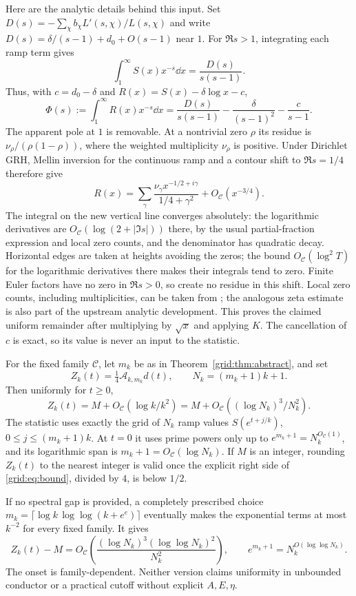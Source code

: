 Here are the analytic details behind this input. Set
$D(s)=-\sum_\chi b_\chi L'(s,\chi)/L(s,\chi)$ and write
$D(s)=\delta/(s-1)+d_0+O(s-1)$ near $1$. For $\Re s>1$, integrating
each ramp term gives
\[
 \int_1^\infty S(x)x^{-s}\dd x=\frac{D(s)}{s(s-1)}.
\]
Thus, with $c=d_0-\delta$ and $R(x)=S(x)-\delta\log x-c$,
\[
 \Phi(s):=\int_1^\infty R(x)x^{-s}\dd x
 =\frac{D(s)}{s(s-1)}-\frac{\delta}{(s-1)^2}-\frac c{s-1}.
\]
The apparent pole at $1$ is removable. At a nontrivial zero $\rho$ its
residue is $\nu_\rho/(\rho(1-\rho))$, where the weighted multiplicity
$\nu_\rho$ is positive. Under Dirichlet GRH, Mellin inversion for the
continuous ramp and a contour shift to $\Re s=1/4$ therefore give
\[
 R(x)=\sum_\gamma
 \frac{\nu_\gamma x^{-1/2+i\gamma}}{1/4+\gamma^2}
 +O_{\mathcal C}(x^{-3/4}).
\]
The integral on the new vertical line converges absolutely: the
logarithmic derivatives are $O_{\mathcal C}(\log(2+|\Im s|))$ there,
by the usual partial-fraction expression and local zero counts, and
the denominator has quadratic decay. Horizontal edges are taken at
heights avoiding the zeros; the bound $O_{\mathcal C}(\log^2 T)$ for
the logarithmic derivatives there makes their integrals tend to zero.
Finite Euler factors have no zero in $\Re s>0$, so create no residue
in this shift. Local zero counts, including multiplicities, can be
taken from \cite{Bennett2021}; the analogous zeta estimate is also
part of the upstream analytic development. This proves the claimed
uniform remainder after multiplying by $\sqrt x$ and applying $K$.
The cancellation of $c$ is exact, so its value is never an input to
the statistic.

\begin{theorem}\label{grid:thm:prime}
For the fixed family $\mathcal C$, let $m_k$ be as in
Theorem~\ref{grid:thm:abstract}, and set
\[
 Z_k(t)=\tfrac14\mathcal A_{k,m_k}d(t),\qquad
 N_k=(m_k+1)k+1.
\]
Then uniformly for $t\ge0$,
\[
 Z_k(t)=M+O_{\mathcal C}(\log k/k^2)
       =M+O_{\mathcal C}((\log N_k)^3/N_k^2).
\]
The statistic uses exactly the grid of $N_k$ ramp values
$S(e^{t+j/k})$, $0\le j\le(m_k+1)k$. At $t=0$ it uses prime powers only
up to $e^{m_k+1}=N_k^{O_{\mathcal C}(1)}$, and its logarithmic span is
$m_k+1=O_{\mathcal C}(\log N_k)$. If $M$ is an integer, rounding $Z_k(t)$
to the nearest integer is valid once the explicit right side of
\eqref{grid:eq:bound}, divided by $4$, is below $1/2$.
\end{theorem}

If no spectral gap is provided, a completely prescribed choice
$m_k=\lceil\log k\,\log\log(k+e^e)\rceil$ eventually makes the exponential
terms at most $k^{-2}$ for every fixed family. It gives
\[
 Z_k(t)-M=O_{\mathcal C}
 \left(\frac{(\log N_k)^3(\log\log N_k)^2}{N_k^2}\right),
 \qquad e^{m_k+1}=N_k^{O(\log\log N_k)}.
\]
The onset is family-dependent. Neither version claims uniformity in
unbounded conductor or a practical cutoff without explicit $A,E,\eta$.

